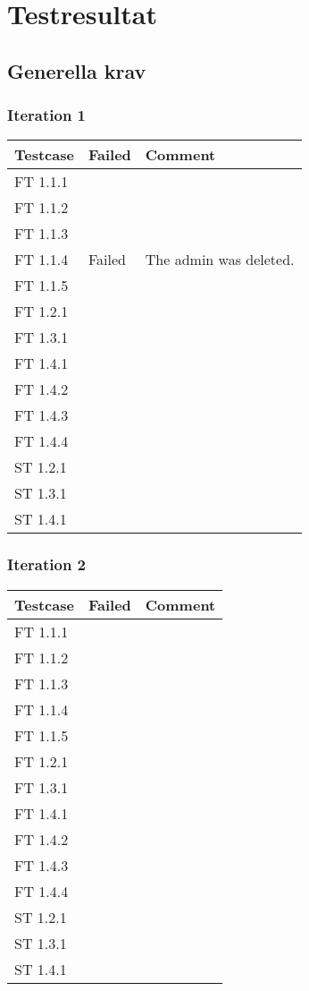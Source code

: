 \documentclass[a4paper]{article}
\begin{document}
\section{Testresultat}


\subsection{Generella krav}

\subsubsection{Iteration 1}
\begin{tabular}{| l | l | p{11cm} |}
\hline
Testcase &  Failed & Comment\\
\hline
FT 1.1.1 & & \\
\hline
FT 1.1.2 & & \\
\hline
FT 1.1.3 & & \\
\hline
FT 1.1.4 & Failed & The admin was deleted.\\
\hline
FT 1.1.5 & & \\
\hline
FT 1.2.1 & & \\
\hline
FT 1.3.1 & & \\
\hline
FT 1.4.1 & & \\
\hline
FT 1.4.2 & & \\
\hline
FT 1.4.3 & & \\
\hline
FT 1.4.4 & & \\
\hline
ST 1.2.1 & & \\
\hline
ST 1.3.1 & & \\
\hline
ST 1.4.1 & & \\
\hline
\end{tabular}

\subsubsection{Iteration 2}
\begin{tabular}{| l | l | p{11cm} |}
\hline
Testcase &  Failed & Comment\\
\hline
FT 1.1.1 & & \\
\hline
FT 1.1.2 & & \\
\hline
FT 1.1.3 & & \\
\hline
FT 1.1.4 & & \\
\hline
FT 1.1.5 & & \\
\hline
FT 1.2.1 & & \\
\hline
FT 1.3.1 & & \\
\hline
FT 1.4.1 & & \\
\hline
FT 1.4.2 & & \\
\hline
FT 1.4.3 & & \\
\hline
FT 1.4.4 & & \\
\hline
ST 1.2.1 & & \\
\hline
ST 1.3.1 & & \\
\hline
ST 1.4.1 & & \\
\hline
\end{tabular}
\end{document}
